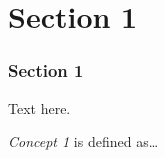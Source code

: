 \section{Section 1}

\begin{frame}[label=1]
\frametitle{Section 1}

Text here.

\begin{block}{{\em Concept 1}}
is defined as\dots
\end{block}

\end{frame}
